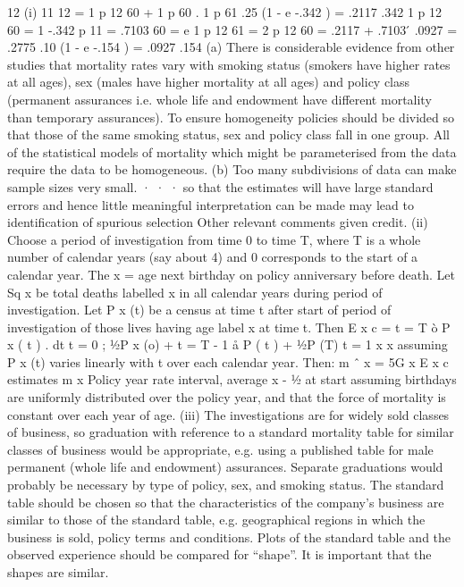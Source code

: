 \documentclass[a4paper,12pt]{article}
\begin{document}
12
(i)
11
12
= 1 p 12
60 + 1 p 60 . 1 p 61
.25
(1 - e -.342 ) = .2117
.342
1 p 12
60 =
1 -.342
p 11
= .7103
60 = e
1 p 12
61 =
2 p 12
60 = .2117 + .7103  ́ .0927 = .2775
.10
(1 - e -.154 ) = .0927
.154
(a) There is considerable evidence from other studies that mortality
rates vary with smoking status (smokers have higher rates at all
ages),
sex (males have higher mortality at all ages)
and policy class (permanent assurances i.e. whole life and
endowment have different mortality than temporary
assurances).
To ensure homogeneity policies should be divided so that those of
the same smoking status, sex and policy class fall in one group.
All of the statistical models of mortality which might be
parameterised from the data require the data to be
homogeneous.
(b) Too many subdivisions of data can make sample sizes very
small.
·
·
·
so that the estimates will have large standard errors
and hence little meaningful interpretation can be made
may lead to identification of spurious selection
Other relevant comments given credit.
(ii)
Choose a period of investigation from time 0 to time T, where T is a whole
number of calendar years (say about 4) and 0 corresponds to the start of a
calendar year.
The x = age next birthday on policy anniversary before death.
Let Sq x be total deaths labelled x in all calendar years during period of
investigation.
Let P x (t) be a census at time t after start of period of investigation of those
lives having age label x at time t. Then
E x c =
t = T
ò
P x ( t ) . dt
t = 0
; 1⁄2P x (o) +
t = T - 1
å P ( t ) + 1⁄2P (T)
t = 1
x
x
assuming P x (t) varies linearly with t over each calendar year.
Then: m ˆ x =
5G x
E x c
estimates m x
Policy year rate interval, average x - 1⁄2 at start assuming
birthdays are uniformly distributed over the policy year, and that the
force of mortality is constant over each year of age.
(iii)
The investigations are for widely sold classes of business, so graduation
with reference to a standard mortality table for similar classes of business
would be appropriate,
e.g. using a published table for male permanent (whole life and
endowment) assurances.
Separate graduations would probably be necessary by type of policy, sex,
and smoking status.
The standard table should be chosen so that the characteristics of the
company’s business are similar to those of the standard table, e.g.
geographical regions in which the business is sold, policy terms and
conditions.
Plots of the standard table and the observed experience should be
compared for “shape”. It is important that the shapes are similar.
\end{document}
